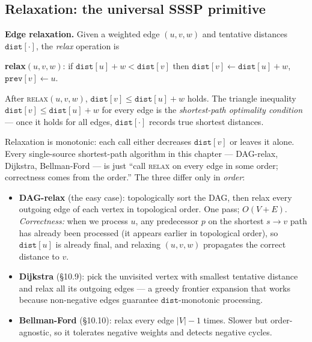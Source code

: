 \documentclass[11pt]{article}
\begin{document}
\subsection*{Relaxation: the universal SSSP primitive}

\begin{defnbox}
\textbf{Edge relaxation.} Given a weighted edge $(u, v, w)$ and
tentative distances $\texttt{dist}[\cdot]$, the \emph{relax} operation is

\begin{center}
\textbf{relax}$(u, v, w)$: \quad if $\texttt{dist}[u] + w < \texttt{dist}[v]$
then $\texttt{dist}[v] \gets \texttt{dist}[u] + w$,
$\texttt{prev}[v] \gets u$.
\end{center}

After \textsc{relax}$(u, v, w)$, $\texttt{dist}[v] \le \texttt{dist}[u] + w$
holds. The triangle inequality
$\texttt{dist}[v] \le \texttt{dist}[u] + w$ for every edge is the
\emph{shortest-path optimality condition} --- once it holds for all
edges, $\texttt{dist}[\cdot]$ records true shortest distances.
\end{defnbox}

Relaxation is monotonic: each call either decreases
$\texttt{dist}[v]$ or leaves it alone. Every single-source
shortest-path algorithm in this chapter --- DAG-relax, Dijkstra,
Bellman-Ford --- is just ``call \textsc{relax} on every edge in some
order; correctness comes from the order.'' The three differ only in
\emph{order}:

\begin{itemize}[leftmargin=*]
    \item \textbf{DAG-relax} (the easy case): topologically sort
          the DAG, then relax every outgoing edge of each vertex
          in topological order. One pass; $O(V + E)$.
          \emph{Correctness:} when we process $u$, any predecessor
          $p$ on the shortest $s \to v$ path has already been
          processed (it appears earlier in topological order), so
          $\texttt{dist}[u]$ is already final, and relaxing
          $(u, v, w)$ propagates the correct distance to $v$.
    \item \textbf{Dijkstra} (\S10.9): pick the unvisited vertex
          with smallest tentative distance and relax all its
          outgoing edges --- a greedy frontier expansion that
          works because non-negative edges guarantee
          $\texttt{dist}$-monotonic processing.
    \item \textbf{Bellman-Ford} (\S10.10): relax every edge
          $|V| - 1$ times. Slower but order-agnostic, so it
          tolerates negative weights and detects negative cycles.
\end{itemize}
\end{document}
